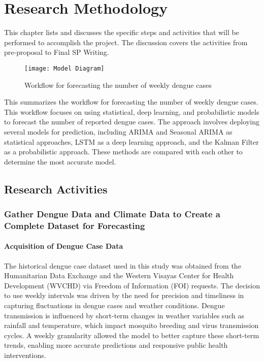 \chapter{Research Methodology}
This chapter lists and discusses the specific steps and activities that will be performed to accomplish the project. 
The discussion covers the activities from pre-proposal to Final SP Writing.

\begin{figure}[ht]
	\centering
	\texttt{[image: Model Diagram]}
	\caption{Workflow for forecasting the number of weekly dengue cases}
	\label{fig:data_snippet}
\end{figure}
This summarizes the workflow for forecasting the number of weekly dengue cases. This workflow focuses on using statistical, deep learning, and probabilistic models to forecast the number of reported dengue cases. The approach involves deploying several models for prediction, including ARIMA and Seasonal ARIMA as statistical approaches, LSTM as a deep learning approach, and the Kalman Filter as a probabilistic approach. These methods are compared with each other to determine the most accurate model.
\section{Research Activities}

\subsection{Gather Dengue Data and Climate Data to Create a Complete Dataset for Forecasting}

\subsubsection{Acquisition of Dengue Case Data}
The historical dengue case dataset used in this study was obtained from the Humanitarian Data Exchange and the Western Visayas Center for Health Development (WVCHD) via Freedom of Information (FOI) requests. The decision to use weekly intervals was driven by the need for precision and timeliness in capturing fluctuations in dengue cases and weather conditions. Dengue transmission is influenced by short-term changes in weather variables such as rainfall and temperature, which impact mosquito breeding and virus transmission cycles. A weekly granularity allowed the model to better capture these short-term trends, enabling more accurate predictions and responsive public health interventions.

